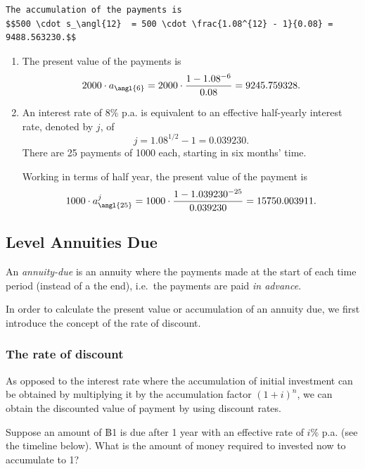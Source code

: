\documentclass[landscape, 20pt]{extreport}
\theoremstyle{definition}
\theoremstyle{definition}
\theoremstyle{definition}
\theoremstyle{definition}
\theoremstyle{remark}
\begin{document}
\begin{verbatim}
The accumulation of the payments is
$$500 \cdot s_\angl{12}  = 500 \cdot \frac{1.08^{12} - 1}{0.08} = 9488.563230.$$
\end{verbatim}

\begin{enumerate}
\def\labelenumi{\arabic{enumi}.}
\setcounter{enumi}{1}
\item
  The present value of the payments is
  \[2000\cdot a_\angl{6}  = 2000 \cdot \frac{1 - 1.08^{-6} }{0.08 } = 9245.759328.\]
\item
  An interest rate of 8\% p.a. is equivalent to an effective
  half-yearly interest rate, denoted by \(j\), of
  \[j = 1.08^{1/2} -1 = 0.039230.\] There are 25 payments of 1000
  each, starting in six months' time.

  Working in terms of half year, the present value of the payment is
  \[1000 \cdot a^j_\angl{25} = 1000 \cdot \frac{1 - 1.039230^{-25} }{0.039230 } = 15750.003911.\]
\end{enumerate}

\newpage \hypertarget{level-annuities-due}{%
\subsection{Level Annuities Due}\label{level-annuities-due}}

An \emph{annuity-due} is an annuity where the payments made at the start of
each time period (instead of a the end), i.e.~the payments are paid \emph{in
advance}.

In order to calculate the present value or accumulation of an annuity
due, we first introduce the concept of the rate of discount.

\hypertarget{the-rate-of-discount}{%
\subsubsection*{The rate of discount}\label{the-rate-of-discount}}

As opposed to the interest rate where the accumulation of initial
investment can be obtained by multiplying it by the accumulation factor
\((1+i)^n\), we can obtain the discounted value of payment by using
discount rates.

Suppose an amount of ฿1 is due after 1 year with an effective rate of
\(i \%\) p.a. (see the timeline below). What is the amount of money
required to invested now to accumulate to 1?
\end{document}
